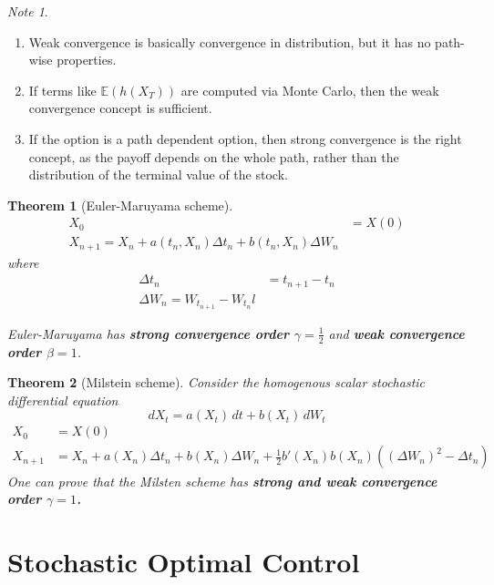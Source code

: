 \documentclass[10pt, oneside, reqno]{amsart}
\theoremstyle{plain}%
\newtheorem{thm}{Theorem}[section]
\numberwithin{equation}{section}
\theoremstyle{definition}
\theoremstyle{remark}
\newtheorem*{note}{Note}
\newcommand{\E}{\mathbb{E}}
\begin{document}
\begin{note}
    \begin{enumerate}
        \item Weak convergence is basically convergence in distribution, but it has no path-wise properties.
        \item If terms like $\E(h(X_T))$ are computed via Monte Carlo, then the weak convergence concept is sufficient.  
        \item If the option is a path dependent option, then strong convergence is the right concept, as the payoff depends on the whole path, rather than the distribution of the terminal value of the stock.  
    \end{enumerate}
\end{note}

\begin{thm}[Euler-Maruyama scheme]
    \begin{align*}
        X_0 &= X(0) \\
        X_{n+1} = X_{n} + a(t_n, X_n) \Delta t_n + b(t_n, X_n) \Delta W_n
    \end{align*} where \begin{align*}
        \Delta t_n &= t_{n+1} - t_n \\
        \Delta W_n = W_{t_{n+1}} - W_{t_n}l
    \end{align*}
    
    Euler-Maruyama has \textbf{strong convergence order $\gamma = \frac{1}{2}$} and \textbf{weak convergence order $\beta = 1$}.
\end{thm}

\begin{thm}[Milstein scheme]
    Consider the homogenous scalar stochastic differential equation \[
        dX_t = a(X_t) \, dt + b(X_t) \, dW_t
    \]  
    \begin{align*}
        X_0 &= X(0) \\
        X_{n+1} &= X_n + a(X_n) \Delta t_n + b(X_n) \Delta W_n + \frac{1}{2} b'(X_n)b(X_n)((\Delta W_n)^2 - \Delta t_n)
    \end{align*}   
    One can prove that the Milsten scheme has \textbf{strong and weak convergence order $\gamma = 1$.}
\end{thm}
\section{Stochastic Optimal Control} %
\label{sec:stochastic_optimal_control}
\end{document}
